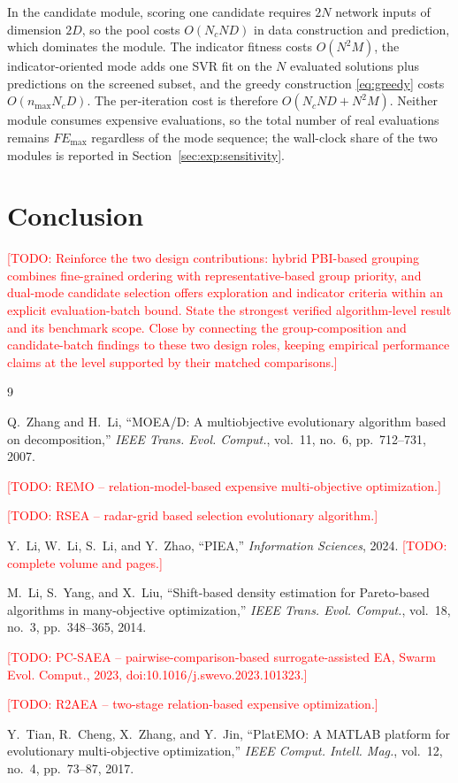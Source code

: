 \documentclass[final,5p,times,twocolumn]{elsarticle}
\newcommand{\TODO}[1]{\textcolor{red}{[TODO: #1]}}
\begin{document}
In the candidate module, scoring one candidate requires $2N$ network inputs of
dimension $2D$, so the pool costs $O(N_cND)$ in data construction and
prediction, which dominates the module. The indicator fitness costs $O(N^2M)$,
the indicator-oriented mode adds one SVR fit on the $N$ evaluated solutions plus
predictions on the screened subset, and the greedy construction \eqref{eq:greedy}
costs $O(n_{\max}N_cD)$. The per-iteration cost is therefore $O(N_cND+N^2M)$.
Neither module consumes expensive evaluations, so the total number of real
evaluations remains $FE_{\max}$ regardless of the mode sequence; the wall-clock
share of the two modules is reported in Section~\ref{sec:exp:sensitivity}.


\section{Conclusion}
\label{sec:conclusion}
\TODO{Reinforce the two design contributions: hybrid PBI-based grouping combines
fine-grained ordering with representative-based group priority, and dual-mode
candidate selection offers exploration and indicator criteria within an
explicit evaluation-batch bound. State the strongest verified algorithm-level
result and its benchmark scope. Close by connecting the group-composition and
candidate-batch findings to these two design roles, keeping empirical performance
claims at the level supported by their matched comparisons.}

\begin{thebibliography}{9}

Q.~Zhang and H.~Li,
``MOEA/D: A multiobjective evolutionary algorithm based on decomposition,''
\emph{IEEE Trans. Evol. Comput.}, vol.~11, no.~6, pp.~712--731, 2007.

\TODO{REMO -- relation-model-based expensive multi-objective optimization.}

\TODO{RSEA -- radar-grid based selection evolutionary algorithm.}

Y.~Li, W.~Li, S.~Li, and Y.~Zhao,
``PIEA,'' \emph{Information Sciences}, 2024.
\TODO{complete volume and pages.}

M.~Li, S.~Yang, and X.~Liu,
``Shift-based density estimation for Pareto-based algorithms in
many-objective optimization,''
\emph{IEEE Trans. Evol. Comput.}, vol.~18, no.~3, pp.~348--365, 2014.

\TODO{PC-SAEA -- pairwise-comparison-based surrogate-assisted EA,
Swarm Evol. Comput., 2023, doi:10.1016/j.swevo.2023.101323.}

\TODO{R2AEA -- two-stage relation-based expensive optimization.}

Y.~Tian, R.~Cheng, X.~Zhang, and Y.~Jin,
``PlatEMO: A MATLAB platform for evolutionary multi-objective optimization,''
\emph{IEEE Comput. Intell. Mag.}, vol.~12, no.~4, pp.~73--87, 2017.

\end{thebibliography}
\end{document}
